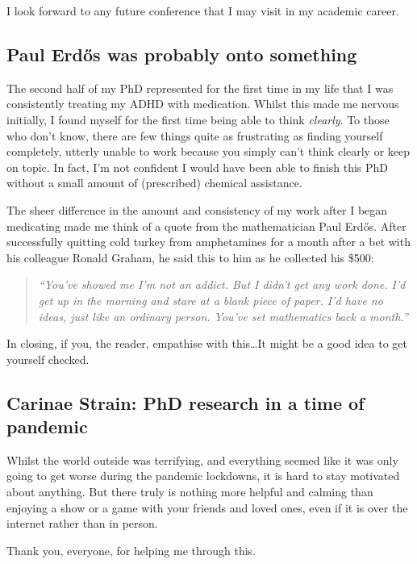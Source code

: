 I look forward to any future conference that I may visit in my academic career.

\subsection{Paul Erd\H{o}s was probably onto something}

The second half of my PhD represented for the first time in my life that I was consistently treating my ADHD with medication.
Whilst this made me nervous initially, I found myself for the first time being able to think \emph{clearly}.
To those who don't know, there are few things quite as frustrating as finding yourself completely, utterly unable to work because you simply can't think clearly or keep on topic.
In fact, I'm not confident I would have been able to finish this PhD without a small amount of (prescribed) chemical assistance.

The sheer difference in the amount and consistency of my work after I began medicating made me think of a quote from the mathematician Paul Erd\H{o}s.
After successfully quitting cold turkey from amphetamines for a month after a bet with his colleague Ronald Graham, he said this to him as he collected his \$500:

\begin{quote}
  \emph{
  \noindent
  ``You've showed me I'm not an addict. But I didn't get any work done. I'd get up in the morning and stare at a blank piece of paper. I'd have no ideas, just like an ordinary person. You've set mathematics back a month.''
  }
\end{quote}

\noindent
In closing, if you, the reader, empathise with this\ldots It might be a good idea to get yourself checked.

\subsection{Carinae Strain: PhD research in a time of pandemic}
\label{sec:pandemic}

Whilst the world outside was terrifying, and everything seemed like it was only going to get worse during the pandemic lockdowns, it is hard to stay motivated about anything.
But there truly is nothing more helpful and calming than enjoying a show or a game with your friends and loved ones, even if it is over the internet rather than in person.

\begin{center}
  Thank you, everyone, for helping me through this.
\end{center}


